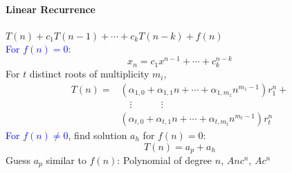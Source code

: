\paragraph{Linear Recurrence}
$T(n)+c_{1}T(n-1)+\cdots+c_{k}T(n-k) + f(n)$\\
\textcolor{Blue}{For $f(n)=0$}:
\[x_n=c_{1}x^{n-1}+\cdots+c_{k}^{n-k}\]
For $t$ distinct roots of multiplicity $m_i$,
\[\begin{split}
  T(n)=&(\alpha_{1,0}+\alpha_{1,1}n+\cdots+\alpha_{1,m_1}n^{m_{1}-1})r_{1}^{n}+\\
       &\quad\vdots\qquad\quad\vdots\\
       &(\alpha_{t,0}+\alpha_{t,1}n+\cdots+\alpha_{t,m_t}n^{m_{t}-1})r_{t}^{n}
\end{split}\]
\textcolor{Blue}{For $f(n)\neq0$}, find solution $a_h$ for $f(n)=0$:
\[T(n)=a_p+a_h\]
Guess $a_p$ similar to $f(n)$: Polynomial of degree $n$, $Anc^n$, $Ac^n$
